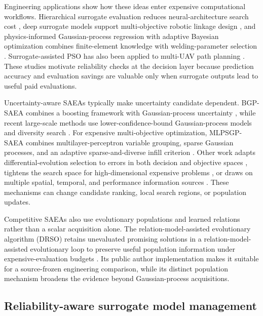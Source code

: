 \documentclass[]{interact}
\begin{document}
Engineering applications show how these ideas enter expensive computational workflows. Hierarchical surrogate evaluation reduces neural-architecture search cost \citep{ref27}, deep surrogate models support multi-objective robotic linkage design \citep{ref28}, and physics-informed Gaussian-process regression with adaptive Bayesian optimization combines finite-element knowledge with welding-parameter selection \citep{ref29}. Surrogate-assisted PSO has also been applied to multi-UAV path planning \citep{ref33}. These studies motivate reliability checks at the decision layer because prediction accuracy and evaluation savings are valuable only when surrogate outputs lead to useful paid evaluations.

Uncertainty-aware SAEAs typically make uncertainty candidate dependent. BGP-SAEA combines a boosting framework with Gaussian-process uncertainty \citep{ref06}, while recent large-scale methods use lower-confidence-bound Gaussian-process models and diversity search \citep{ref07}. For expensive multi-objective optimization, MLPSGP-SAEA combines multilayer-perceptron variable grouping, sparse Gaussian processes, and an adaptive sparse-and-diverse infill criterion \citep{ref32}. Other work adapts differential-evolution selection to errors in both decision and objective spaces \citep{ref08}, tightens the search space for high-dimensional expensive problems \citep{ref09}, or draws on multiple spatial, temporal, and performance information sources \citep{ref10}. These mechanisms can change candidate ranking, local search regions, or population updates.

Competitive SAEAs also use evolutionary populations and learned relations rather than a scalar acquisition alone. The relation-model-assisted evolutionary algorithm (DRSO) retains unevaluated promising solutions in a relation-model-assisted evolutionary loop to preserve useful population information under expensive-evaluation budgets \citep{ref30}. Its public author implementation makes it suitable for a source-frozen engineering comparison, while its distinct population mechanism broadens the evidence beyond Gaussian-process acquisitions.

\hypertarget{reliability-aware-surrogate-model-management}{%
\subsection{Reliability-aware surrogate model management}\label{reliability-aware-surrogate-model-management}}
\end{document}
